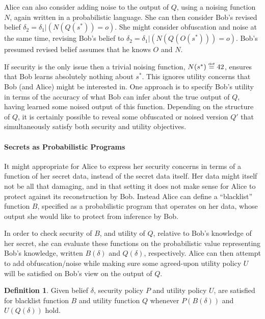 \documentclass{article} %
\newcommand{\asecret}[0]{s}
\newcommand{\rsecret}[0]{\asecret^*}
\newcommand{\paren}[1]{\left( #1 \right)}
\newcommand{\cond}[0]{|}
\newcommand{\stacklabel}[1]{\stackrel{\smash{\scriptscriptstyle \mathrm{#1}}}}
\newcommand{\defeq}{\stacklabel{def}=}
\theoremstyle{plain} %
\theoremstyle{definition} %
\newtheorem*{definition-un}{Definition}
\begin{document}
Alice can also consider adding noise to the output of $ Q $, using a
noising function $ N $, again written in a probabilistic language. She
can then consider Bob's revised belief $ \delta_2 = \delta_1 \cond
\paren{N(Q(\rsecret)) = o} $. She might consider obfuscation and noise
at the same time, revising Bob's belief to $ \delta_2 = \delta_1 \cond
\paren{N(Q(O(\rsecret))) = o} $. Bob's presumed revised belief assumes
that he knows $ O $ and $ N $.

If security is the only issue then a trivial noising function, $
N(\rsecret) \defeq 42 $, ensures that Bob learns absolutely nothing
about $ \rsecret $.  This ignores utility concerns that Bob (and
Alice) might be interested in. One approach is to specify Bob's
utility in terms of the accuracy of what Bob can infer about the true
output of $ Q $, having learned some noised output of this function.
Depending on the structure of $ Q $, it is certainly possible to
reveal some obfuscated or noised version $Q'$ that simultaneously
satisfy both security and utility objectives.

\paragraph*{Secrets as Probabilistic Programs}  It might
appropriate for Alice to express her security concerns in terms of a
function of her secret data, instead of the secret data itself.  Her
data might itself not be all that damaging, and in that setting it
does not make sense for Alice to protect against its reconstruction by
Bob.  Instead Alice can define a ``blacklist'' function $ B $,
specified as a probabilistic program that operates on her data, whose
output she would like to protect from inference by Bob.

In order to check security of $ B $, and utility of $ Q $, relative
to Bob's knowledge of her secret, she can evaluate these functions on
the probabilistic value representing Bob's knowledge, written $
B(\delta) $ and $ Q(\delta) $, respectively. Alice can then attempt to
add obfuscation/noise while making sure some agreed-upon utility policy
$ U $ will be satisfied on Bob's view on the output of $ Q $.

\begin{definition-un}
Given belief $ \delta $, security policy $ P $ and utility policy $ U
$, are satisfied for blacklist function $ B $ and utility function $ Q
$ whenever $P(B(\delta))$ and $U(Q(\delta))$ hold. 
\end{definition-un}
\end{document}
